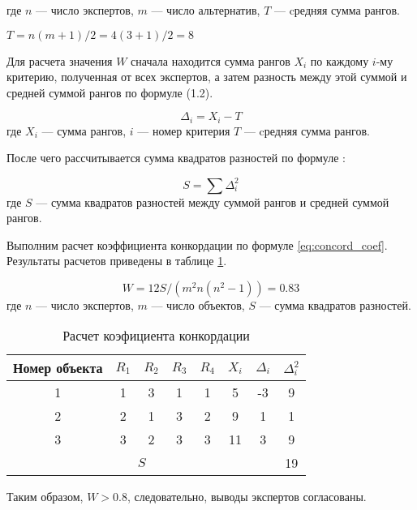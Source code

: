 где $n$ --- число экспертов,
$m$ --- число альтернатив, 
$T$ --- cредняя сумма рангов.

\begin{center}
    $T=n(m+1)/2 = 4(3+1)/2=8$
\end{center}

Для расчета значения $W$ сначала находится сумма рангов $X_i$ по каждому $i$-му критерию, полученная от всех экспертов, а затем разность между этой суммой и средней суммой рангов по формуле (1.2).

\begin{equation}
    \Delta_i=X_i-T
\end{equation}
где $X_i$ --- сумма рангов,
$i$ --- номер критерия 
$T$ --- cредняя сумма рангов.

После чего рассчитывается сумма квадратов разностей по формуле :

\begin{equation}
    S=\sum{\Delta^2_i}
\end{equation}
где $S$ --- сумма квадратов разностей между суммой рангов и средней суммой рангов.

Выполним расчет коэффициента конкордации по формуле \ref{eq:concord_coef}.
Результаты расчетов приведены в таблице \ref{table:experts_concord}.

\begin{equation}
    \label{eq:concord_coef}
    W = 12S/(m^2 n (n^2-1)) = 0.83
\end{equation}
где $n$ --- число экспертов,
$m$ --- число объектов,
$S$ --- сумма квадратов разностей.

\begin{table}[H]
    \centering
    \caption{Расчет коэфициента конкордации}\label{table:experts_concord}
    \begin{tabular}{|c|c|c|c|c|c|c|c|}
    \hline Номер объекта & $R_1$ & $R_2$ & $R_3$ & $R_4$ & $X_i$ & $\Delta_i$ & $\Delta^2_i$ \\
    \hline 1 & 1 & 3 & 1 & 1  & 5 & -3 & 9 \\
    \hline 2 & 2 & 1 & 3 &  2 & 9 & 1 & 1 \\
    \hline 3 & 3 & 2 & 3 & 3 & 11 & 3 & 9 \\
    \hline \multicolumn{7}{|c|}{$S$} & 19 \\
    \hline
    \end{tabular}
\end{table}

Таким образом, $W>0.8$, следовательно, выводы экспертов согласованы.

